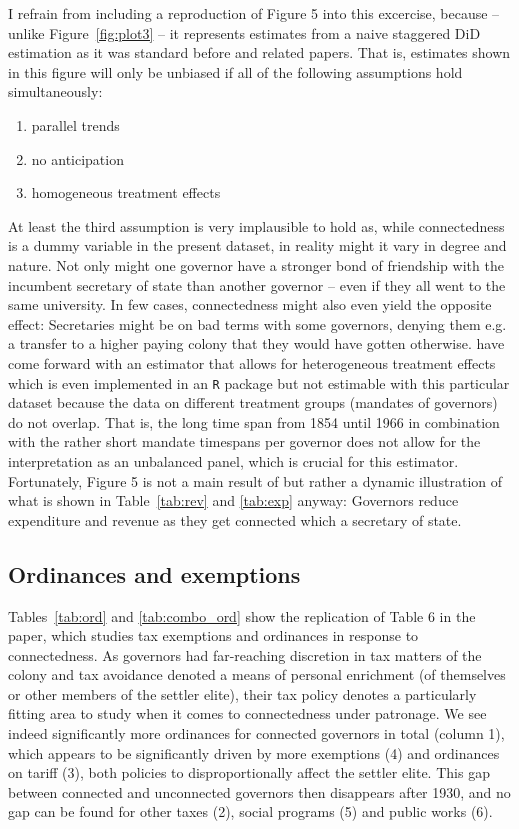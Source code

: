 \documentclass[a4paper]{article}\usepackage[]{graphicx}\usepackage[]{color}
\begin{document}
\hspace*{5mm} I refrain from including a reproduction of Figure 5 into this excercise, because -- unlike Figure~\ref{fig:plot3} -- it represents estimates from a naive staggered DiD estimation as it was standard before \cite{sun2021} and related papers. That is, estimates shown in this figure will only be unbiased if all of the following assumptions hold simultaneously:
\begin{enumerate}
  \item parallel trends
  \item no anticipation
  \item homogeneous treatment effects
\end{enumerate}
\hspace*{5mm} At least the third assumption is very implausible to hold as, while connectedness is a dummy variable in the present dataset, in reality might it vary in degree and nature. Not only might one governor have a stronger bond of friendship with the incumbent secretary of state than another governor -- even if they all went to the same university. In few cases, connectedness might also even yield the opposite effect: Secretaries might be on bad terms with some governors, denying them e.g. a transfer to a higher paying colony that they would have gotten otherwise. \cite{callaway2021} have come forward with an estimator that allows for heterogeneous treatment effects which is even implemented in an \texttt{R} package but not estimable with this particular dataset because the data on different treatment groups (mandates of governors) do not overlap. That is, the long time span from 1854 until 1966 in combination with the rather short mandate timespans per governor does not allow for the interpretation as an unbalanced panel, which is crucial for this estimator. Fortunately, Figure 5 is not a main result of \cite{guoxu2018} but rather a dynamic illustration of what is shown in Table~\ref{tab:rev} and \ref{tab:exp} anyway: Governors reduce expenditure and revenue as they get connected which a secretary of state.    

\subsection{Ordinances and exemptions}
\hspace*{5mm} Tables~\ref{tab:ord} and \ref{tab:combo_ord} show the replication of Table 6 in the paper, which studies tax exemptions and ordinances in response to connectedness. As governors had far-reaching discretion in tax matters of the colony and tax avoidance denoted a means of personal enrichment (of themselves or other members of the settler elite), their tax policy denotes a particularly fitting area to study when it comes to connectedness under patronage. We see indeed significantly more ordinances for connected governors in total (column 1), which appears to be significantly driven by more exemptions (4) and ordinances on tariff (3), both policies to disproportionally affect the settler elite. This gap between connected and unconnected governors then disappears after 1930, and no gap can be found for other taxes (2), social programs (5) and public works (6).
\end{document}
